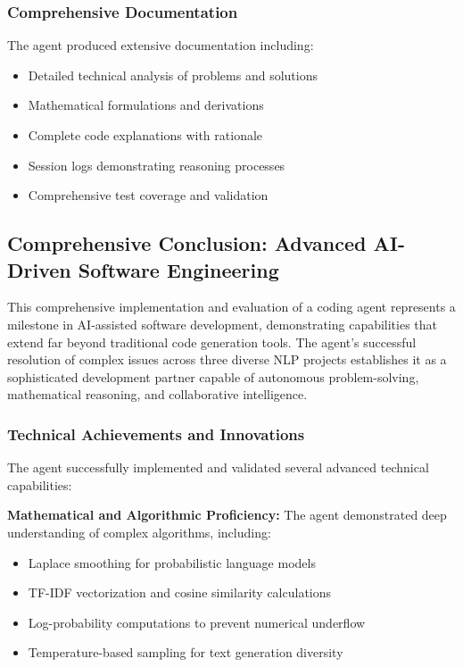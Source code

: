 \documentclass[12pt, a4paper]{article}
\begin{document}
\subsubsection{Comprehensive Documentation}
The agent produced extensive documentation including:
\begin{itemize}
    \item Detailed technical analysis of problems and solutions
    \item Mathematical formulations and derivations
    \item Complete code explanations with rationale
    \item Session logs demonstrating reasoning processes
    \item Comprehensive test coverage and validation
\end{itemize}

\subsection{Comprehensive Conclusion: Advanced AI-Driven Software Engineering}

This comprehensive implementation and evaluation of a coding agent represents a milestone in AI-assisted software development, demonstrating capabilities that extend far beyond traditional code generation tools. The agent's successful resolution of complex issues across three diverse NLP projects establishes it as a sophisticated development partner capable of autonomous problem-solving, mathematical reasoning, and collaborative intelligence.

\subsubsection{Technical Achievements and Innovations}

The agent successfully implemented and validated several advanced technical capabilities:

\textbf{Mathematical and Algorithmic Proficiency:} The agent demonstrated deep understanding of complex algorithms, including:
\begin{itemize}
    \item Laplace smoothing for probabilistic language models
    \item TF-IDF vectorization and cosine similarity calculations
    \item Log-probability computations to prevent numerical underflow
    \item Temperature-based sampling for text generation diversity
\end{itemize}
\end{document}

